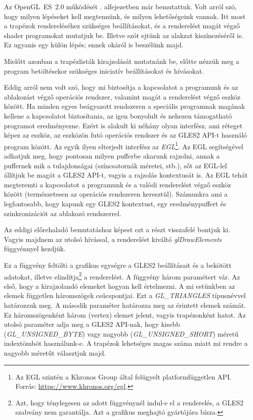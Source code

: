 \documentclass[12pt]{report}
\theoremstyle{definition}
\newcommand{\func}[1]{{\textsl{#1}}}
\begin{document}
Az OpenGL~ES~2.0 működését . alfejezetben már bemutattuk. Volt
arról szó, hogy milyen lépéseket kell megtennünk, és milyen lehetőségeink
vannak. Itt most a trapézok rendereléséhez szükséges beállításokat, és a
renderelést magát végző shader programokat mutatjuk be. Illetve szót ejtünk az
alakzat kiszínezéséről is. Ez ugyanis egy külön lépés; ennek okáról is
beszélünk majd.

Mielőtt azonban a trapézlisták kirajzolását mutatnánk be, előtte nézzük meg a
program betöltésekor szükséges iniciatív beállításokat és hívásokat.

Eddig arról nem volt szó, hogy mi biztosítja a kapcsolatot a programunk és az
ablakozást végző operációs rendszer, valamint magát a renderelést végző eszköz
között. Ha minden egyes beágyazott rendszeren a speciális programnak magának
kellene a kapcsolatot biztosítania, az igen bonyolult és nehezen támogatható
programot eredményezne. Ezért is alakult ki néhány olyan interfész, ami réteget
képez az eszköz, az eszközön futó operációs rendszer és az GLES2 API-t használó
program között. Az egyik ilyen elterjedt interfész az \emph{EGL}\footnote{Az
EGL szintén a Khronos Group által felügyelt platformfüggetlen API. \\ Forrás:
{\footnotesize\url{https://www.khronos.org/egl}}.}. Az EGL segítségével
adhatjuk meg, hogy pontosan milyen pufferbe akarunk rajzolni, annak a puffernek
mik a tulajdonságai (színcsatornák méretei, stb.), sőt az EGL-lel állítjuk be
magát a GLES2 API-t, vagyis a rajzolás kontextusát is. Az EGL tehát megteremti
a kapcsolatot a programunk és a valódi renderelést végző eszköz között
(természetesen az operációs rendszeren keresztül). Számunkra ami a
legfontosabb, hogy kapunk egy GLES2 kontextust, egy eredménypuffert és
szinkronizációt az ablakozó rendszerrel.

Az eddigi előrehaladó bemutatáshoz képest ezt a részt visszafelé bontjuk ki.
Vagyis majdnem az utolsó hívással, a renderelést kiváltó \func{glDrawElements}
függvénnyel kezdjük.

Ez a függvény feltölti a grafikus egységre a GLES2 beállításait és a bekötött
adatokat, illetve elindítja\footnote{Azt, hogy ténylegesen az adott függvénynél
indul-e el a renderelés, a GLES2 szabvány nem garantálja. Azt a grafikus
meghajtó gyártójára bízza.} a renderelést. A függvény három paramétert vár. Az
első, hogy a kirajzolandó elemeket hogyan kell értelmezni. A mi estünkben az
elemek független háromszögek csúcspontjai. Ezt a \func{GL\_TRIANGLES}
típusnévvel határozzuk meg. A második paraméter határozza meg az érintett
elemek számát. Ez háromszögenként három (vertex) elemet jelent, vagyis
trapézonként hatot. Az utolsó paraméter adja meg a GLES2 API-nak, hogy kisebb
(\func{GL\_UNSIGNED\_BYTE}) vagy nagyobb (\func{GL\_UNSIGNED\_SHORT}) méretű
indextömböt használunk-e. A trapézok lehetséges magas száma miatt mi rendre a
nagyobb méretűt választjuk majd.
\end{document}

